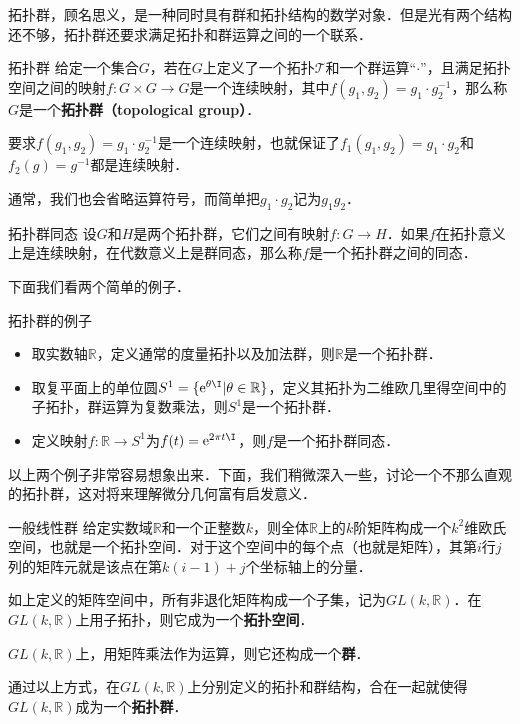 


拓扑群，顾名思义，是一种同时具有群和拓扑结构的数学对象．但是光有两个结构还不够，拓扑群还要求满足拓扑和群运算之间的一个联系．

\begin{definition}{拓扑群}
给定一个集合$G$，若在$G$上定义了一个拓扑$\mathcal{T}$和一个群运算“$\cdot$”，且满足拓扑空间之间的映射$f:G\times G\rightarrow G$是一个连续映射，其中$f(g_1, g_2)=g_1\cdot g_2^{-1}$，那么称$G$是一个\textbf{拓扑群（topological group）}．
\end{definition}

要求$f(g_1, g_2)=g_1\cdot g_2^{-1}$是一个连续映射，也就保证了$f_1(g_1, g_2)=g_1\cdot g_2$和$f_2(g)=g^{-1}$都是连续映射．

通常，我们也会省略运算符号，而简单把$g_1\cdot g_2$记为$g_1g_2$．

\begin{definition}{拓扑群同态}
设$G$和$H$是两个拓扑群，它们之间有映射$f:G\rightarrow H$．如果$f$在拓扑意义上是连续映射，在代数意义上是群同态，那么称$f$是一个拓扑群之间的同态．
\end{definition}

下面我们看两个简单的例子．

\begin{example}{拓扑群的例子}
\begin{itemize}
\item 取实数轴$\mathbb{R}$，定义通常的度量拓扑以及加法群，则$\mathbb{R}$是一个拓扑群．
\item 取复平面上的单位圆$S^1=\{\mathrm{e}^{\theta\I}|\theta\in\mathbb{R}\}$，定义其拓扑为二维欧几里得空间中的子拓扑，群运算为复数乘法，则$S^1$是一个拓扑群．
\item 定义映射$f:\mathbb{R}\rightarrow S^1$为$f(t)=\mathrm{e}^{2\pi t\I}$，则$f$是一个拓扑群同态．
\end{itemize}
\end{example}

以上两个例子非常容易想象出来．下面，我们稍微深入一些，讨论一个不那么直观的拓扑群，这对将来理解微分几何富有启发意义．

\begin{example}{一般线性群}
给定实数域$\mathbb{R}$和一个正整数$k$，则全体$\mathbb{R}$上的$k$阶矩阵构成一个$k^2$维欧氏空间，也就是一个拓扑空间．对于这个空间中的每个点（也就是矩阵），其第$i$行$j$列的矩阵元就是该点在第$k(i-1)+j$个坐标轴上的分量．

如上定义的矩阵空间中，所有非退化矩阵构成一个子集，记为$GL(k, \mathbb{R})$．在$GL(k,\mathbb{R})$上用子拓扑，则它成为一个\textbf{拓扑空间}．

$GL(k,\mathbb{R})$上，用矩阵乘法作为运算，则它还构成一个\textbf{群}．

通过以上方式，在$GL(k, \mathbb{R})$上分别定义的拓扑和群结构，合在一起就使得$GL(k, \mathbb{R})$成为一个\textbf{拓扑群}．
\end{example}

